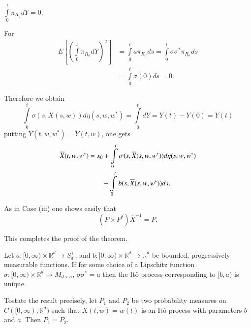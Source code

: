 \begin{claim*}
$\int\limits^{t}_{0}\pi_{R_{\sigma}}dY=0$.

For
\begin{align*}
E\left[\left(\int\limits^{t}_{0}\pi_{R_{\sigma}}dY\right)^{2}\right]
&=
\int\limits^{t}_{0}a\pi_{R_{\sigma}}ds=\int\limits^{t}_{0}\sigma\sigma^{*}\pi_{R_{\sigma}}ds\\
&= \int\limits^{t}_{0}\sigma(0)ds=0.
\end{align*}

Therefore we obtain
$$
\int\limits^{t}_{0}\sigma(s,X(s,w))d\eta(s,w,w^{*})=\int\limits^{t}_{0}dY=Y(t)-Y(0)=Y(t) 
$$
putting $\overline{Y}(t,w,w^{*})=Y(t,w)$, one gets
\begin{align*}
\overline{X}(t,w,w^{*}) &=
x_{0}+\int\limits^{t}_{0}\sigma(s,\overline{X}(s,w,w^{*}))d\eta(s,w,w^{*})\\
&\qquad +\int\limits^{t}_{0}b(s,\overline{X}(s,w,w^{*}))ds.
\end{align*}

As in Case (iii) one shows easily that
$$
(P\times P^{*})\overline{X}^{-1}=P.
$$

This completes the proof of the theorem.
\end{claim*}

\begin{coro*}
Let $a:[0,\infty)\times \mathbb{R}^{d}\to S^{+}_{d}$, and
  $b:[0,\infty)\times \mathbb{R}^{d}\to \mathbb{R}^{d}$ be bounded,
    progressively measurable functions. If for some choice of a
    Lipschitz function $\sigma:[0,\infty)\times \mathbb{R}^{d}\to
      M_{d\times n}$, $\sigma\sigma^{*}=a$ then the It\^o process
      corresponding to $[b,a)$ is unique.
\end{coro*}

To\pageoriginale  state the result precisely, let $P_{1}$ and $P_{2}$
be two probability measures on $C([0,\infty);\mathbb{R}^{d})$ such
  that $X(t,w)=w(t)$ is an It\^o process with parameters $b$ and
  $a$. Then $P_{1}=P_{2}$.

